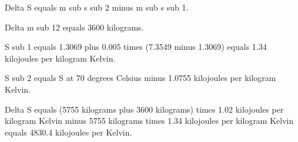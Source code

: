Delta S equals m sub s sub 2 minus m sub s sub 1.  

Delta m sub 12 equals 3600 kilograms.  

S sub 1 equals 1.3069 plus 0.005 times (7.3549 minus 1.3069) equals 1.34 kilojoules per kilogram Kelvin.  

S sub 2 equals S at 70 degrees Celsius minus 1.0755 kilojoules per kilogram Kelvin.  

Delta S equals (5755 kilograms plus 3600 kilograms) times 1.02 kilojoules per kilogram Kelvin minus 5755 kilograms times 1.34 kilojoules per kilogram Kelvin equals 4830.4 kilojoules per Kelvin.